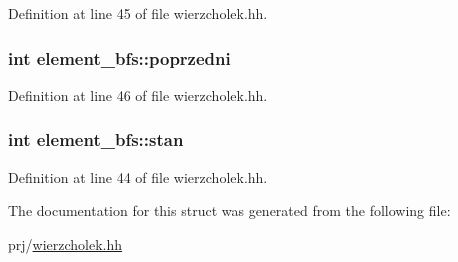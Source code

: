 \-Definition at line 45 of file wierzcholek.\-hh.

\hypertarget{structelement__bfs_a94b882f6922be485d6942f71c29e581d}{
\subsubsection[{poprzedni}]{\setlength{\rightskip}{0pt plus 5cm}int {\bf element\-\_\-bfs\-::poprzedni}}}\label{structelement__bfs_a94b882f6922be485d6942f71c29e581d}


\-Definition at line 46 of file wierzcholek.\-hh.

\hypertarget{structelement__bfs_aa654df64808f513f41d0349571e4b90e}{
\subsubsection[{stan}]{\setlength{\rightskip}{0pt plus 5cm}int {\bf element\-\_\-bfs\-::stan}}}\label{structelement__bfs_aa654df64808f513f41d0349571e4b90e}


\-Definition at line 44 of file wierzcholek.\-hh.



\-The documentation for this struct was generated from the following file\-:\begin{DoxyCompactItemize}
\item 
prj/\hyperlink{wierzcholek_8hh}{wierzcholek.\-hh}\end{DoxyCompactItemize}
